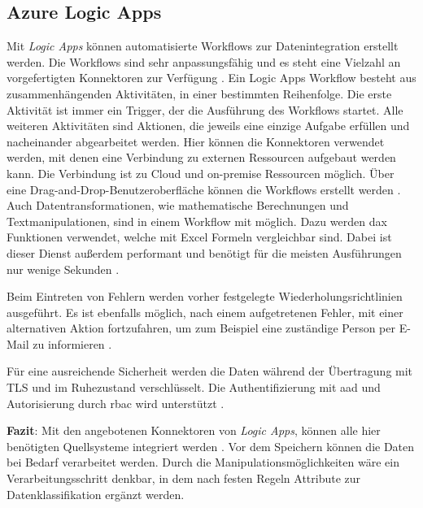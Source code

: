\subsection{Azure Logic Apps} \label{sec:grundlagen:azure_dienste:logicApps}
Mit \textit{Logic Apps} können automatisierte Workflows zur Datenintegration erstellt werden. Die Workflows sind sehr anpassungsfähig und es steht eine Vielzahl an vorgefertigten Konnektoren zur Verfügung \cite{kumar_serverless_2019}. Ein Logic Apps Workflow besteht aus zusammenhängenden Aktivitäten, in einer bestimmten Reihenfolge. Die erste Aktivität ist immer ein Trigger, der die Ausführung des Workflows startet. Alle weiteren Aktivitäten sind Aktionen, die jeweils eine einzige Aufgabe erfüllen und nacheinander abgearbeitet werden. Hier können die Konnektoren verwendet werden, mit denen eine Verbindung zu externen Ressourcen aufgebaut werden kann. Die Verbindung ist zu Cloud und on-premise Ressourcen möglich. Über eine Drag-and-Drop-Benutzeroberfläche können die Workflows erstellt werden \cite{modi_azure_2020}. Auch Datentransformationen, wie mathematische Berechnungen und Textmanipulationen, sind in einem Workflow mit möglich. Dazu werden \ac{dax} Funktionen verwendet, welche mit Excel Formeln vergleichbar sind. Dabei ist dieser Dienst außerdem performant und benötigt für die meisten Ausführungen nur wenige Sekunden \cite{bennett_enterprise_2021}.

Beim Eintreten von Fehlern werden vorher festgelegte Wiederholungsrichtlinien ausgeführt. Es ist ebenfalls möglich, nach einem aufgetretenen Fehler, mit einer alternativen Aktion fortzufahren, um zum Beispiel eine zuständige Person per E-Mail zu informieren \cite{msdoc_21_azureLogicAppsWorkflowsHandleErrors}.

Für eine ausreichende Sicherheit werden die Daten während der Übertragung mit TLS und im Ruhezustand verschlüsselt. Die Authentifizierung mit \ac{aad} und Autorisierung durch \ac{rbac} wird unterstützt \cite{baldwin_azure_logicApps_2021}. 

\textbf{Fazit}: Mit den angebotenen Konnektoren von \textit{Logic Apps}, können alle hier benötigten Quellsysteme integriert werden \cite[vgl.][]{msdoc_21_azureLogicAppsConnectors}. Vor dem Speichern können die Daten bei Bedarf verarbeitet werden. Durch die Manipulationsmöglichkeiten wäre ein Verarbeitungsschritt denkbar, in dem nach festen Regeln Attribute zur Datenklassifikation ergänzt werden.


